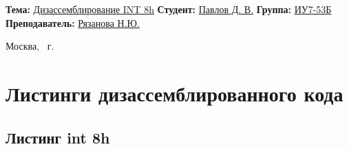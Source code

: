 \begin{titlepage}
		\noindent\textbf{Тема:} \underline{Дизассемблирование INT 8h}\newline\newline
		\noindent\textbf{Студент:} \underline{Павлов Д. В.}\newline\newline
		\noindent\textbf{Группа:} \underline{ИУ7-53Б}\newline\newline
		\noindent\textbf{Преподаватель:} \underline{Рязанова Н.Ю.}\newline
		
		\begin{center}
			\mbox{}
			\vfill
			Москва, \the\year ~г.
		\end{center}
		\clearpage
	\end{titlepage}
	
	\section{Листинги дизассемблированного кода}
	\subsection{Листинг int 8h}
	
